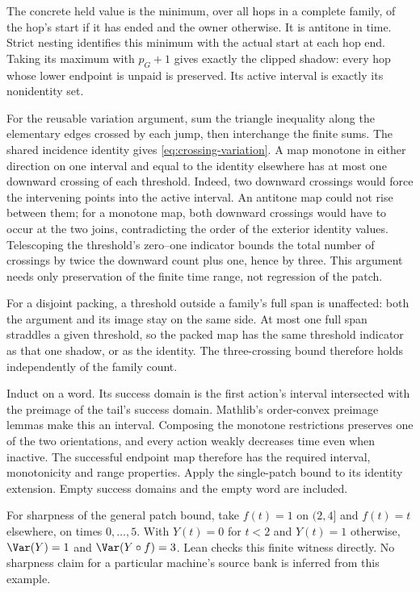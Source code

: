 \begin{outline}
The concrete held value is the minimum, over all hops in a complete
family, of the hop's start if it has ended and the owner otherwise.
It is antitone in time. Strict nesting identifies this minimum with
the actual start at each hop end. Taking its maximum with $p_G+1$
gives exactly the clipped shadow: every hop whose lower endpoint is
unpaid is preserved. Its active interval is exactly its nonidentity set.

For the reusable variation argument, sum the triangle inequality along
the elementary edges crossed by each jump, then interchange the finite
sums. The shared incidence identity gives \cref{eq:crossing-variation}.
A map monotone in either direction on one interval and equal to the
identity elsewhere has at most one downward crossing of each threshold.
Indeed, two downward crossings would force the intervening points into
the active interval. An antitone map could not rise between them; for a
monotone map, both downward crossings would have to occur at the two
joins, contradicting the order of the exterior identity values.
Telescoping the threshold's zero--one indicator bounds the total number
of crossings by twice the downward count plus one, hence by three.
This argument needs only preservation of the finite time range, not
regression of the patch.

For a disjoint packing, a threshold outside a family's full span is
unaffected: both the argument and its image stay on the same side.
At most one full span straddles a given threshold, so the packed map
has the same threshold indicator as that one shadow, or as the identity.
The three-crossing bound therefore holds independently of the family count.

Induct on a word. Its success domain is the first action's interval
intersected with the preimage of the tail's success domain. Mathlib's
order-convex preimage lemmas make this an interval. Composing the
monotone restrictions preserves one of the two orientations, and every
action weakly decreases time even when inactive. The successful endpoint
map therefore has the required interval, monotonicity and range properties.
Apply the single-patch bound to its identity extension. Empty success
domains and the empty word are included.

For sharpness of the general patch bound, take $f(t)=1$ on $(2,4]$ and
$f(t)=t$ elsewhere, on times $0,\ldots,5$. With $Y(t)=0$ for $t<2$ and
$Y(t)=1$ otherwise, $\Var(Y)=1$ and $\Var(Y\circ f)=3$. Lean
checks this finite witness directly. No sharpness claim for a particular
machine's source bank is inferred from this example.
\end{outline}

